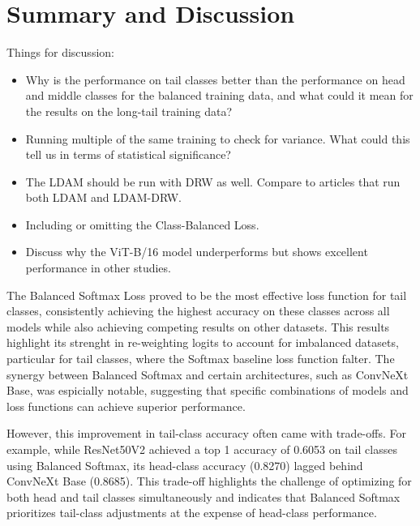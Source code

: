 
\section{Summary and Discussion}
Things for discussion:

\begin{itemize}
    \item Why is the performance on tail classes better than the performance on head and middle classes for the balanced training data, and what could it mean for the results on the long-tail training data?
    \item Running multiple of the same training to check for variance. What could this tell us in terms of statistical significance?
    \item The LDAM should be run with DRW as well. Compare to articles that run both LDAM and LDAM-DRW.
    \item Including or omitting the Class-Balanced Loss.
    \item Discuss why the ViT-B/16 model underperforms but shows excellent performance in other studies.
\end{itemize}


The Balanced Softmax Loss proved to be the most effective loss function for tail classes, consistently achieving the highest accuracy on these classes across all models while also achieving competing results on other datasets. This results highlight its strenght in re-weighting logits to account for imbalanced datasets, particular for tail classes, where the Softmax baseline loss function falter. The synergy between Balanced Softmax and certain architectures, such as ConvNeXt Base, was espicially notable, suggesting that specific combinations of models and loss functions can achieve superior performance.

However, this improvement in tail-class accuracy often came with trade-offs. For example, while ResNet50V2 achieved a top 1 accuracy of 0.6053 on tail classes using Balanced Softmax, its head-class accuracy (0.8270) lagged behind ConvNeXt Base (0.8685). This trade-off highlights the challenge of optimizing for both head and tail classes simultaneously and indicates that Balanced Softmax prioritizes tail-class adjustments at the expense of head-class performance. 

